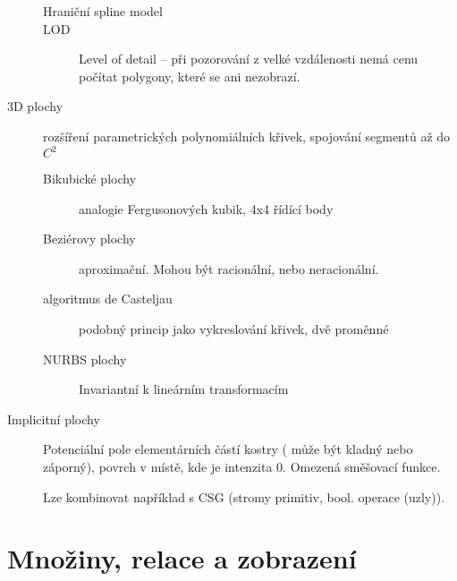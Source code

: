 \documentclass[a4paper, 11pt]{report}
\begin{document}
\begin{description}
\begin{description}
		\item[Hraniční spline model]
		\item[LOD] Level of detail -- při pozorování z velké vzdálenosti nemá cenu počítat polygony, které se ani nezobrazí.
	\end{description}
	\item[3D plochy] rozšíření parametrických polynomiálních křivek, spojování segmentů až do $C^2$
	\begin{description}
		\item[Bikubické plochy] analogie Fergusonových kubik, 4x4 řídící body
		\item[Beziérovy plochy] aproximační. Mohou být racionální, nebo neracionální.
		\item[algoritmus de Casteljau] podobný princip jako vykreslování křivek, dvě proměnné
		\item[NURBS plochy] Invariantní k lineárním transformacím
	\end{description}
	\item[Implicitní plochy] Potenciální pole elementárních částí kostry ( může být kladný nebo záporný), povrch v místě, kde je intenzita 0. Omezená směšovací funkce.
	
	Lze kombinovat například s CSG (stromy primitiv, bool. operace (uzly)).
	
\end{description}






































\setcounter{chapter}{15}
\chapter{Množiny, relace a zobrazení} \label{cha:16}
\end{document}
